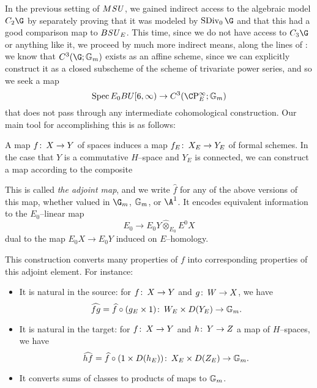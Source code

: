 In the previous setting of $M\mathit{SU}$, we gained indirect access to the algebraic model $C_2 \G$ by separately proving that it was modeled by $\SDiv_0 \G$ and that this had a good comparison map to $B\mathit{SU}_E$.  This time, since we do not have access to $C_3 \G$ or anything like it, we proceed by much more indirect means, along the lines of : we know that $C^3(\G; \Gm)$ exists as an affine scheme, since we can explicitly construct it as a closed subscheme of the scheme of trivariate power series, and so we seek a map \[\Spec E_0 BU[6, \infty) \to C^3(\CP^\infty_E; \Gm)\] that does not pass through any intermediate cohomological construction.  Our main tool for accomplishing this is as follows:
\begin{definition}
A map $f\colon\thinspace X \to Y$ of spaces induces a map $f_E \colon\thinspace X_E \to Y_E$ of formal schemes.  In the case that $Y$ is a commutative $H$--space and $Y_E$ is connected, we can construct a map according to the composite
\begin{center}
\end{center}
This is called \textit{the adjoint map}, and we write $\widehat f$ for any of the above versions of this map, whether valued in $\G_m$, $\mathbb G_m$, or $\A^1$.  It encodes equivalent information to the $E_0$--linear map \[E_0 \to E_0 Y \widehat\otimes_{E_0} E^0 X\] dual to the map $E_0 X \to E_0 Y$ induced on $E$--homology.
\end{definition}

\begin{remark}
This construction converts many properties of $f$ into corresponding properties of this adjoint element.  For instance:
\begin{itemize}
    \item It is natural in the source: for $f\colon\thinspace X \to Y$ and $g\colon\thinspace W \to X$, we have \[\widehat{fg} = \widehat{f} \circ (g_E \times 1)\colon\thinspace W_E \times D(Y_E) \to \mathbb G_m.\]
    \item It is natural in the target: for $f\colon\thinspace X \to Y$ and $h\colon\thinspace Y \to Z$ a map of $H$--spaces, we have \[\widehat{hf} = \widehat{f} \circ (1 \times D(h_E))\colon\thinspace X_E \times D(Z_E) \to \mathbb G_m.\]
    \item It converts sums of classes to products of maps to $\mathbb G_m$.
\end{itemize}
\end{remark}

